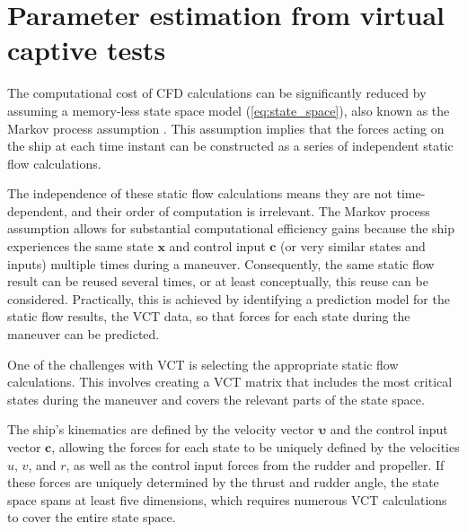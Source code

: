 \section{Parameter estimation from virtual captive tests} \label{sec:VCT}
The computational cost of CFD calculations can be significantly reduced by assuming a memory-less state space model (\autoref{eq:state_space}), also known as the Markov process assumption \cite{yoonIdentificationHydrodynamicCoefficients2003}. This assumption implies that the forces acting on the ship at each time instant can be constructed as a series of independent static flow calculations.

The independence of these static flow calculations means they are not time-dependent, and their order of computation is irrelevant. The Markov process assumption allows for substantial computational efficiency gains because the ship experiences the same state $\mathbf{x}$ and control input $\mathbf{c}$ (or very similar states and inputs) multiple times during a maneuver. Consequently, the same static flow result can be reused several times, or at least conceptually, this reuse can be considered. Practically, this is achieved by identifying a prediction model for the static flow results, the VCT data, so that forces for each state during the maneuver can be predicted.

One of the challenges with VCT is selecting the appropriate static flow calculations. This involves creating a VCT matrix that includes the most critical states during the maneuver and covers the relevant parts of the state space.

The ship's kinematics are defined by the velocity vector $\pmb{\bm{\upsilon}}$ and the control input vector $\mathbf{c}$, allowing the forces for each state to be uniquely defined by the velocities $u$, $v$, and $r$, as well as the control input forces from the rudder and propeller. If these forces are uniquely determined by the thrust and rudder angle, the state space spans at least five dimensions, which requires numerous VCT calculations to cover the entire state space.

